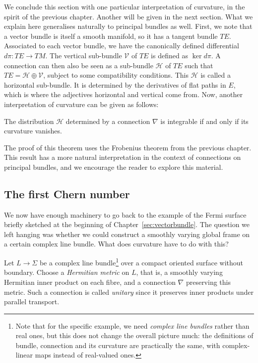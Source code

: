 We conclude this section with one particular interpretation of curvature, in the spirit of the previous chapter. Another will be given in the next section. What we explain here generalises naturally to principal bundles as well. First, we note that a vector bundle is itself a smooth manifold, so it has a tangent bundle $TE$. Associated to each vector bundle, we have the canonically defined differential $d\pi:TE\to TM$. The vertical sub-bundle $\mathcal{V}$ of $TE$ is defined as $\ker d\pi$. A connection can then also be seen as a sub-bundle $\mathcal{H}$ of $TE$ such that $TE=\mathcal{H}\oplus\mathcal{V}$, subject to some compatibility conditions. This $\mathcal{H}$ is called a horizontal sub-bundle. It is determined by the derivatives of flat paths in $E$, which is where the adjectives horizontal and vertical come from. Now, another interpretation of curvature can be given as follows:
\begin{theorem}
  The distribution $\mathcal{H}$ determined by a connection $\nabla$ is integrable if and only if its curvature vanishes.
\end{theorem}
The proof of this theorem uses the Frobenius theorem from the previous chapter. This result has a more natural interpretation in the context of connections on principal bundles, and we encourage the reader to explore this material.

\subsection{The first Chern number}\label{sec:first-chern-number}

We now have enough machinery to go back to the example of the Fermi surface briefly sketched at the beginning of Chapter~\ref{sec:vectorbundle}.
The question we left hanging was whether we could construct a smoothly varying global frame on a certain complex line bundle. What does curvature have to do with this?

Let $L\to\Sigma$ be a complex line bundle\footnote{Note that for the specific example, we need \emph{complex line bundles} rather than real ones, but this does not change the overall picture much: the definitions of bundle, connection and its curvature are practically the same, with complex-linear maps instead of real-valued ones.} over a compact oriented surface without boundary.
Choose a \emph{Hermitian metric} on $L$, that is, a smoothly varying Hermitian inner product on each fibre, and a connection $\nabla$ preserving this metric. Such a connection is called \emph{unitary} since it preserves inner products under parallel transport.

